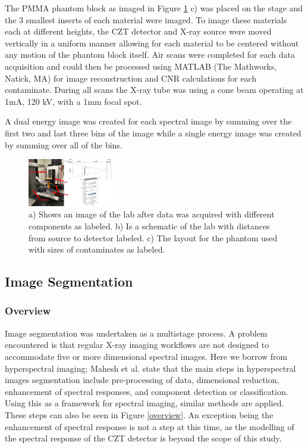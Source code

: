 \documentclass[a4paper,11pt]{article}
\begin{document}
The PMMA phantom block as imaged in Figure \ref{figure:setup} c) was placed on the stage and the 3 smallest inserts of each material were imaged. To image these materials each at different heights, the CZT detector and X-ray source were moved vertically in a uniform manner allowing for each material to be centered without any motion of the phantom block itself. Air scans were completed for each data acquisition and could then be processed using MATLAB (The Mathworks, Natick, MA) for image reconstruction and CNR calculations for each contaminate. During all scans the X-ray tube was using a cone beam operating at 1mA, 120 kV, with a 1mm focal spot.

A dual energy image was created for each spectral image by summing over the first two and last three bins of the image while a single energy image was created by summing over all of the bins.


\begin{figure}
  
  \begin{center}
    \includegraphics[width=0.33\textwidth]{FullFigure.jpg}
  \end{center}
  
  \caption{a) Shows an image of the lab after data was acquired with different components as labeled. b) Is a schematic of the lab with distances from source to detector labeled. c) The layout for the phantom used with sizes of contaminates as labeled.}
  \label{figure:setup}
\end{figure}

\subsection{Image Segmentation}
\subsubsection{Overview}

Image segmentation was undertaken as a multistage process. A problem encountered is that regular X-ray imaging workflows are not designed to accommodate five or more dimensional spectral images. Here we borrow from hyperspectral imaging; Mahesh et al. \cite{Mahesh2015HyperspectralMaterials} state that the main steps in hyperspectral images segmentation include pre-processing of data, dimensional reduction, enhancement of spectral responses, and component detection or classification. Using this as a framework for spectral imaging, similar methods are applied. These steps can also be seen in Figure \ref{overview}. An exception being the enhancement of spectral response is not a step at this time, as the modelling of the spectral response of the CZT detector is beyond the scope of this study.
\end{document}
